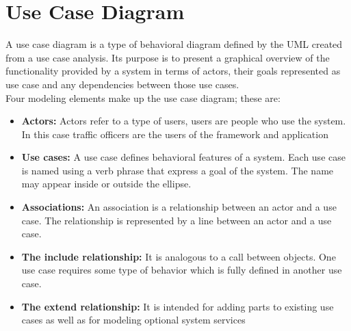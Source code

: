 \documentclass[openany,12pt]{report}
\begin{document}
\section{Use Case Diagram}
\hspace*{0.5in} A use case diagram is a type of behavioral diagram defined by the UML created from a use case analysis. Its purpose is to present a graphical overview of the functionality provided by a system in terms of actors, their goals represented as use case and any dependencies between those use cases.\\
\hspace*{0.5in}Four modeling elements make up the use case diagram; these are:\\
\begin{itemize}
\item{\textbf{Actors:} Actors refer to a type of users, users are people who use the system. In this case traffic officers are the users of the framework and application}
\item{\textbf{Use cases:} A use case defines behavioral features of a system. Each use case is named using a verb phrase that express a goal of the system. The name may appear inside or outside the ellipse.}
\item{\textbf{Associations:} An association is a relationship between an actor and a use case. The relationship is represented by a line between an actor and a use case.}
\item{\textbf{The include relationship:} It is analogous to a call between objects. One use case requires some type of behavior which is fully defined in  another use case.}
\item{\textbf{The extend relationship:} It is intended for adding parts to existing use cases as well as for modeling optional system services}
\end{itemize}
\end{document}
